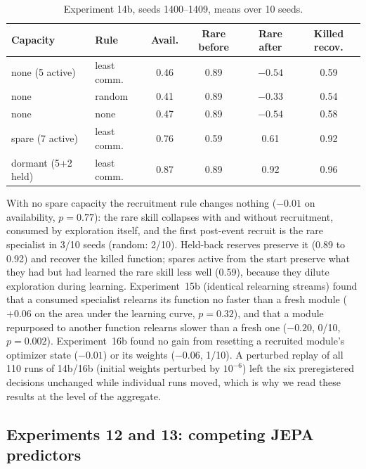 \documentclass[11pt,a4paper]{article}
\begin{document}
\begin{table}[h]
\centering\small\setlength{\tabcolsep}{4pt}
\begin{tabular}{llcccc}
\toprule
Capacity & Rule & Avail. & Rare before & Rare after & Killed recov. \\
\midrule
none (5 active) & least comm. & 0.46 & 0.89 & $-0.54$ & 0.59 \\
none & random & 0.41 & 0.89 & $-0.33$ & 0.54 \\
none & none & 0.47 & 0.89 & $-0.54$ & 0.58 \\
spare (7 active) & least comm. & 0.76 & 0.59 & 0.61 & 0.92 \\
dormant (5+2 held) & least comm. & 0.87 & 0.89 & 0.92 & 0.96 \\
\bottomrule
\end{tabular}
\caption{Experiment 14b, seeds 1400--1409, means over 10 seeds.}
\label{tab:exp14b}
\end{table}

With no spare capacity the recruitment rule changes nothing ($-0.01$ on availability, $p = 0.77$): the rare skill collapses with and without recruitment, consumed by exploration itself, and the first post-event recruit is the rare specialist in 3/10 seeds (random: 2/10). Held-back reserves preserve it (0.89 to 0.92) and recover the killed function; spares active from the start preserve what they had but had learned the rare skill less well (0.59), because they dilute exploration during learning. Experiment~15b (identical relearning streams) found that a consumed specialist relearns its function no faster than a fresh module ($+0.06$ on the area under the learning curve, $p = 0.32$), and that a module repurposed to another function relearns slower than a fresh one ($-0.20$, 0/10, $p = 0.002$). Experiment~16b found no gain from resetting a recruited module's optimizer state ($-0.01$) or its weights ($-0.06$, 1/10). A perturbed replay of all 110 runs of 14b/16b (initial weights perturbed by $10^{-6}$) left the six preregistered decisions unchanged while individual runs moved, which is why we read these results at the level of the aggregate.

\subsection{Experiments 12 and 13: competing JEPA predictors}
\end{document}
